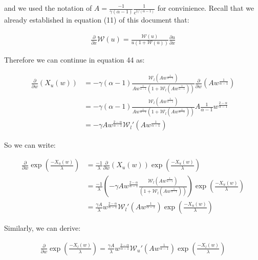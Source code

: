 \documentclass{article}
\newcommand{\sW}{\mathscr{W}}
\begin{document}
and we used the notation of $A = \frac{-1}{\gamma (\alpha-1)} \frac{1}{c^{1/(\alpha-1)}}$ for convinience. Recall that we already established in equation (11) of this document that:

\begin{align}
\frac{\partial}{\partial x} \sW(u) = \frac{\sW(u)}{ u (1+\sW(u)) } \frac{\partial u}{\partial x}
\end{align}
    
Therefore we can continue in equation 44 as:

\begin{align}
\frac{\partial}{\partial w}(X_{u}(w)) &= -\gamma (\alpha-1) \frac{\sW_l(A w^{ \frac{1}{\alpha-1} })}{ A w^{\frac{1}{\alpha-1}} \left( 1 + \sW_l(A w^{ \frac{1}{\alpha-1} }) \right) } \frac{\partial}{\partial w}(A w^{\frac{1}{\alpha-1}}) \\
&= -\gamma (\alpha-1) \frac{\sW_l(A w^{ \frac{1}{\alpha-1} })}{ A w^{\frac{1}{\alpha-1}} \left( 1 + \sW_l(A w^{ \frac{1}{\alpha-1} }) \right) } A \frac{1}{\alpha-1} w^{\frac{2-\alpha}{\alpha-1}} \\
&= -\gamma A w^{\frac{2-\alpha}{\alpha-1}} \sW_l'(Aw^{\frac{1}{\alpha - 1}})
\end{align}
        
So we can write: 

\begin{align}
\frac{\partial}{\partial w} \exp \left( \frac{-X_{u}(w)}{\lambda} \right) &= \frac{-1}{\lambda} \frac{\partial}{\partial w}(X_{u}(w)) \exp(\frac{-X_{u}(w)}{\lambda}) \\
&= \frac{-1}{\lambda} \left( -\gamma A w^{\frac{2-\alpha}{\alpha-1}} \frac{\sW_l(A w^{ \frac{1}{\alpha-1} })}{ \left( 1 + \sW_l(A w^{ \frac{1}{\alpha-1} }) \right)} \right) \exp(\frac{-X_{u}(w)}{\lambda}) \\
&= \frac{\gamma A }{\lambda} w^{\frac{2-\alpha}{\alpha-1}} \sW_l'(A w^{ \frac{1}{\alpha-1} }) \exp(\frac{-X_{u}(w)}{\lambda}) 
\end{align}
    
Similarly, we can derive:

\begin{align}
\frac{\partial}{\partial w} \exp \left( \frac{-X_{l}(w)}{\lambda} \right) = \frac{\gamma A }{\lambda} w^{\frac{2-\alpha}{\alpha-1}} \sW_u'(A w^{ \frac{1}{\alpha-1} }) \exp(\frac{-X_{l}(w)}{\lambda}) 
\end{align}
   
\end{document}
